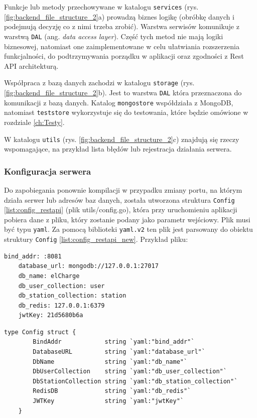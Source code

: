 Funkcje lub metody przechowywane w katalogu \texttt{services} (rys. \ref{fig:backend_file_structure_2}a) prowadzą biznes logikę (obróbkę danych i podejmują decyzję co z nimi trzeba zrobić). Warstwa serwisów komunikuje z warstwą \texttt{DAL} (ang. \textit{data access layer}). Część tych metod nie mają logiki biznesowej, natomiast one zaimplementowane w celu ułatwiania rozszerzenia funkcjalności, do podtrzymywania porządku w aplikacji oraz zgodności z Rest API architekturą.

Współpraca z bazą danych zachodzi w katalogu \texttt{storage} (rys. \ref{fig:backend_file_structure_2}b). Jest to warstwa \texttt{DAL} która przeznaczona do komunikacji z bazą danych. Katalog \texttt{mongostore} współdziała z MongoDB, natomiast \texttt{teststore} wykorzystuje się do testowania, które będzie omówione w rozdziale \ref{ch:Testy}.

W katalogu \texttt{utils} (rys. \ref{fig:backend_file_structure_2}c) znajdują się rzeczy wspomagające, na przykład lista błędów lub rejestracja działania serwera.

\subsubsection{Konfiguracja serwera}
Do zapobiegania ponownie kompilacji w przypadku zmiany portu, na którym działa serwer lub adresów baz danych, została utworzona struktura \texttt{Config} \ref{list:config_restapi} (plik utils/config.go), która przy uruchomieniu aplikacji pobiera dane z pliku, który zostanie podany jako parametr wejściowy.
Plik musi być typu \texttt{yaml}. Za pomocą biblioteki \texttt{yaml.v2} ten plik jest parsowany do obiektu struktury \texttt{Config} \ref{list:config_restapi_new}. Przykład pliku:\begin{lstlisting}[basicstyle=\tiny\ttfamily]
    bind_addr: :8081
    database_url: mongodb://127.0.0.1:27017
    db_name: elCharge
    db_user_collection: user
    db_station_collection: station
    db_redis: 127.0.0.1:6379
    jwtKey: 21d5680b6a
\end{lstlisting}

\begin{lstlisting}[label=list:config_restapi,caption=Klasa konfiguracyjna części serwerowej.,basicstyle=\tiny\ttfamily]
    type Config struct {
        BindAddr            string `yaml:"bind_addr"`
        DatabaseURL         string `yaml:"database_url"`
        DbName              string `yaml:"db_name"`
        DbUserCollection    string `yaml:"db_user_collection"`
        DbStationCollection string `yaml:"db_station_collection"`
        RedisDB             string `yaml:"db_redis"`
        JWTKey              string `yaml:"jwtKey"`
    }
\end{lstlisting}

